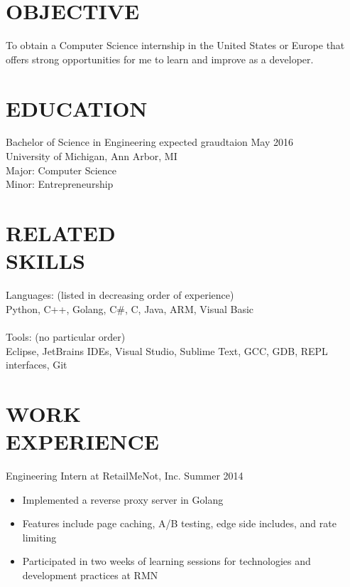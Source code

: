 \documentclass[line,margin]{res}
\begin{document}

\color{HeaderColor}
\address{ajlj@umich.edu -- 248-622-7017}
\address{Citizen of the United States and Italy}
 
 \renewcommand{\labelitemi}{$-$}
 
\begin{resume}
\color{black}
\section{\textcolor{HeaderColor}{OBJECTIVE}}
				To obtain a Computer Science internship in the United States or Europe that offers strong opportunities for me to learn and improve as a developer.

\section{\textcolor{HeaderColor}{EDUCATION}} {\sc Bachelor of Science in Engineering} \hfill expected graudtaion May 2016\\
				University of Michigan, Ann Arbor, MI \\
                Major: Computer Science \\
                Minor: Entrepreneurship
 
\section{\textcolor{HeaderColor}{RELATED \\ SKILLS}} 
				{\sc Languages: (listed in decreasing order of experience)} \\
				Python, C++, Golang, C\#, C, Java, ARM, Visual Basic \\ \\
                {\sc Tools: (no particular order)} \\
                Eclipse, JetBrains IDEs, Visual Studio, Sublime Text, GCC, GDB, REPL interfaces, Git
 
\section{\textcolor{HeaderColor}{WORK \\ EXPERIENCE}} 
                {\sc Engineering Intern at RetailMeNot, Inc.} \hfill Summer 2014
                 \begin{itemize}  \itemsep -2pt %
                 \item Implemented a reverse proxy server in Golang
                 \item Features include page caching, A/B testing, edge side includes, and rate limiting
                 \item Participated in two weeks of learning sessions for technologies and development practices at RMN
                 \end{itemize}


\end{resume}
\end{document}

